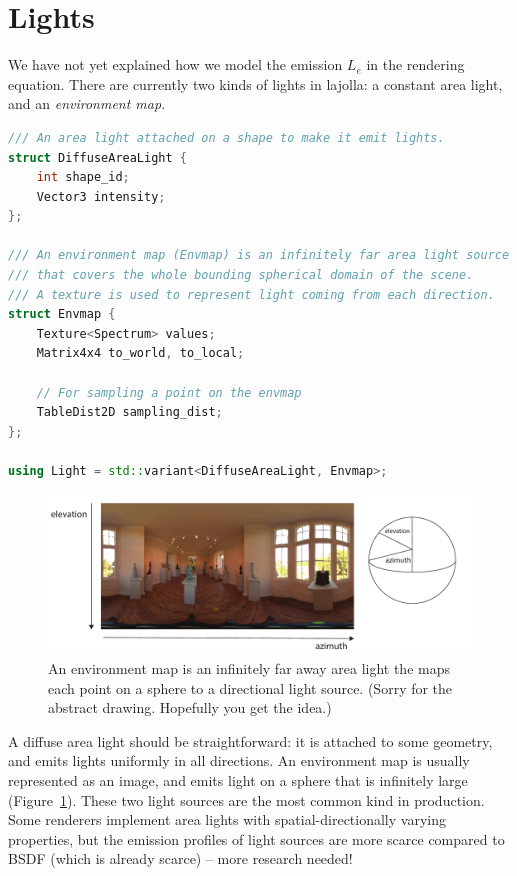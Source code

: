 \section{Lights}
We have not yet explained how we model the emission $L_e$ in the rendering equation. There are currently two kinds of lights in lajolla: a constant area light, and an \emph{environment map}.
\begin{lstlisting}[language=c++]
/// An area light attached on a shape to make it emit lights.
struct DiffuseAreaLight {
    int shape_id;
    Vector3 intensity;
};

/// An environment map (Envmap) is an infinitely far area light source
/// that covers the whole bounding spherical domain of the scene.
/// A texture is used to represent light coming from each direction.
struct Envmap {
    Texture<Spectrum> values;
    Matrix4x4 to_world, to_local;

    // For sampling a point on the envmap
    TableDist2D sampling_dist;
};

using Light = std::variant<DiffuseAreaLight, Envmap>;
\end{lstlisting}

\begin{figure}
    \centering
    \includegraphics[width=0.6\linewidth]{imgs/envmap.pdf}
    \caption{An environment map is an infinitely far away area light the maps each point on a sphere to a directional light source. (Sorry for the abstract drawing. Hopefully you get the idea.)}
    \label{fig:envmap}
\end{figure}

A diffuse area light should be straightforward: it is attached to some geometry, and emits lights uniformly in all directions. An environment map is usually represented as an image, and emits light on a sphere that is infinitely large (Figure~\ref{fig:envmap}). These two light sources are the most common kind in production. Some renderers implement area lights with spatial-directionally varying properties, but the emission profiles of light sources are more scarce compared to BSDF (which is already scarce) -- more research needed!

